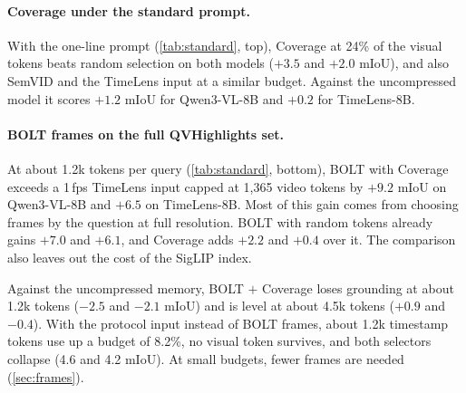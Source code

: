 \paragraph{Coverage under the standard prompt.}
With the one-line prompt (\cref{tab:standard}, top), Coverage at 24\% of the visual tokens beats random selection on
both models ($+3.5$ and $+2.0$ mIoU), and also SemVID and the TimeLens input at a similar budget. Against the
uncompressed model it scores $+1.2$ mIoU for Qwen3-VL-8B and $+0.2$ for TimeLens-8B.

\paragraph{BOLT frames on the full QVHighlights set.}
At about 1.2k tokens per query (\cref{tab:standard}, bottom), BOLT with Coverage exceeds a 1\,fps TimeLens input
capped at 1{,}365 video tokens by $+9.2$ mIoU on Qwen3-VL-8B and $+6.5$ on TimeLens-8B. Most of this gain comes from
choosing frames by the question at full resolution. BOLT with random tokens already gains $+7.0$ and $+6.1$, and
Coverage adds $+2.2$ and $+0.4$ over it. The comparison also leaves out the cost of the SigLIP index.

Against the uncompressed memory, BOLT $+$ Coverage loses grounding at about 1.2k tokens ($-2.5$ and $-2.1$ mIoU) and
is level at about 4.5k tokens ($+0.9$ and $-0.4$). With the protocol input instead of BOLT frames, about 1.2k
timestamp tokens use up a budget of 8.2\%, no visual token survives, and both selectors collapse (4.6 and 4.2
mIoU). At small budgets, fewer frames are needed (\cref{sec:frames}).

